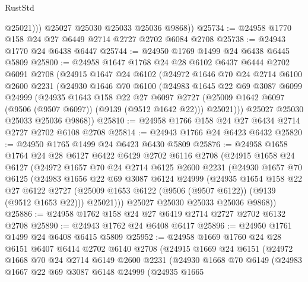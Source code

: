 \begin{lexlean}{RustStd}
\begin{coremodule}
              @25021)))
        @25027
        @25030
        @25033
        @25036
        @9868))
@25734 := @24958 @1770 @158 @24 @27 @6449 @2714 @2727 @2702 @6084 @2708
@25738 := @24943 @1770 @24 @6438 @6447
@25744 := @24950 @1769 @1499 @24 @6438 @6445 @5809
@25800 := @24958
    @1647
    @1768
    @24
    @28
    @6102
    @6437
    @6444
    @2702
    @6091
    @2708
    (@24915
      @1647
      @24
      @6102
      (@24972
        @1646
        @70
        @24
        @2714
        @6100
        @2600
        @2231
        (@24930
          @1646
          @70
          @6100
          (@24983
            @1645
            @22
            @69
            @3087
            @6099
            @24999
            (@24935
              @1643
              @158
              @22
              @27
              @6097
              @2727
              (@25009 @1642 @6097 (@9506 (@9507 @6097)) (@9139 (@9512 @1642 @22)))
              @25021)))
        @25027
        @25030
        @25033
        @25036
        @9868))
@25810 := @24958 @1766 @158 @24 @27 @6434 @2714 @2727 @2702 @6108 @2708
@25814 := @24943 @1766 @24 @6423 @6432
@25820 := @24950 @1765 @1499 @24 @6423 @6430 @5809
@25876 := @24958
    @1658
    @1764
    @24
    @28
    @6127
    @6422
    @6429
    @2702
    @6116
    @2708
    (@24915
      @1658
      @24
      @6127
      (@24972
        @1657
        @70
        @24
        @2714
        @6125
        @2600
        @2231
        (@24930
          @1657
          @70
          @6125
          (@24983
            @1656
            @22
            @69
            @3087
            @6124
            @24999
            (@24935
              @1654
              @158
              @22
              @27
              @6122
              @2727
              (@25009 @1653 @6122 (@9506 (@9507 @6122)) (@9139 (@9512 @1653 @22)))
              @25021)))
        @25027
        @25030
        @25033
        @25036
        @9868))
@25886 := @24958 @1762 @158 @24 @27 @6419 @2714 @2727 @2702 @6132 @2708
@25890 := @24943 @1762 @24 @6408 @6417
@25896 := @24950 @1761 @1499 @24 @6408 @6415 @5809
@25952 := @24958
    @1669
    @1760
    @24
    @28
    @6151
    @6407
    @6414
    @2702
    @6140
    @2708
    (@24915
      @1669
      @24
      @6151
      (@24972
        @1668
        @70
        @24
        @2714
        @6149
        @2600
        @2231
        (@24930
          @1668
          @70
          @6149
          (@24983
            @1667
            @22
            @69
            @3087
            @6148
            @24999
            (@24935
              @1665

\end{coremodule}
\end{lexlean}

